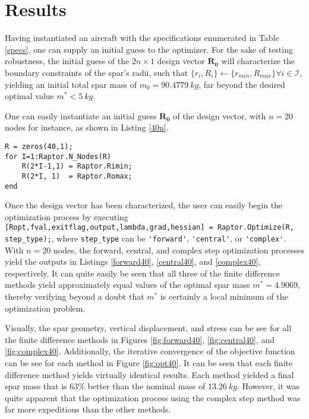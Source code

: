 \documentclass{article}
\begin{document}
\section{Results}
Having instantiated an aircraft with the specifications enumerated in Table \ref{specs}, one can supply an initial guess to the optimizer. For the sake of testing robustness, the initial guess of the $2n \times 1$ design vector $\mathbf{R_0}$ will characterize the boundary constraints of the spar's radii, such that $ \{r_i, R_i\} \leftarrow \{r_{min}, R_{max} \} \forall i \in \mathcal{I}$, yielding an initial total spar mass of $m_0 = 90.4779~kg$, far beyond the desired optimal value $m^* < 5~kg$.

One can easily instantiate an initial guess $\mathbf{R_0}$ of the design vector, with $n=20$ nodes for instance, as shown in Listing \ref{40n}. 
\begin{lstlisting}[caption=20 Node Design Vector, label=40n]
% Take an initial guess of the spar's radii.
R = zeros(40,1);
for I=1:Raptor.N_Nodes(R)
    R(2*I-1,1) = Raptor.Rimin;
    R(2*I, 1)  = Raptor.Romax;
end
\end{lstlisting}
Once the design vector has been characterized, the user can easily begin the optimization process by executing \lstinline[breaklines=true]{[Ropt,fval,exitflag,output,lambda,grad,hessian] = Raptor.Optimize(R, step_type);}, where \lstinline{step_type} can be \lstinline{'forward'}, \lstinline{'central'}, or \lstinline{'complex'}. With $n=20$ nodes, the forward, central, and complex step optimization processes yield the outputs in Listings \ref{forward40}, \ref{central40}, and \ref{complex40}, respectively. It can quite easily be seen that all three of the finite difference methods yield approximately equal values of the optimal spar mass $m^* = 4.9069$, thereby verifying beyond a doubt that $m^*$ is certainly a local minimum of the optimization problem. 

Visually, the spar geometry, vertical displacement, and stress can be see for all the finite difference methods in Figures \ref{fig:forward40}, \ref{fig:central40}, and \ref{fig:complex40}. Additionally, the iterative convergence of the objective function can be see for each method in Figure \ref{fig:opt40}. It can be seen that each finite difference method yields virtually identical results. Each method yielded a final spar mass that is $63\%$ better than the nominal mass of $13.26~kg$. However, it was quite apparent that the optimization process using the complex step method was far more expeditious than the other methods.
\end{document}
